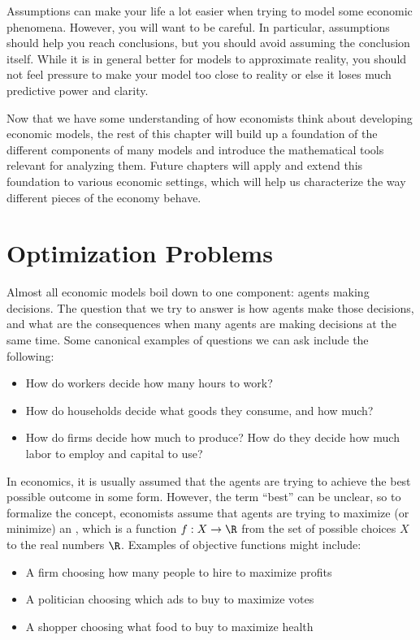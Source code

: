 Assumptions can make your life a lot easier when trying to model some economic phenomena. However, you will want to be careful. In particular, assumptions should help you reach conclusions, but you should avoid assuming the conclusion itself. While it is in general better for models to approximate reality, you should not feel pressure to make your model too close to reality or else it loses much predictive power and clarity.

Now that we have some understanding of how economists think about developing economic models, the rest of this chapter will build up a foundation of the different components of many models and introduce the mathematical tools relevant for analyzing them. Future chapters will apply and extend this foundation to various economic settings, which will help us characterize the way different pieces of the economy behave.

\section{Optimization Problems}
Almost all economic models boil down to one component: agents making decisions. The question that we try to answer is how agents make those decisions, and what are the consequences when many agents are making decisions at the same time. Some canonical examples of questions we can ask include the following:
\begin{itemize}
    \item How do workers decide how many hours to work?
    \item How do households decide what goods they consume, and how much?
    \item How do firms decide how much to produce? How do they decide how much labor to employ and capital to use?
\end{itemize}

In economics, it is usually assumed that the agents are trying to achieve the best possible outcome in some form. However, the term ``best'' can be unclear, so to formalize the concept, economists assume that agents are trying to maximize (or minimize) an , which is a function $f: X \to \R$ from the set of possible choices $X$ to the real numbers $\R$. Examples of objective functions might include:
\begin{itemize}
    \item A firm choosing how many people to hire to maximize profits
    \item A politician choosing which ads to buy to maximize votes
    \item A shopper choosing what food to buy to maximize health
\end{itemize}

